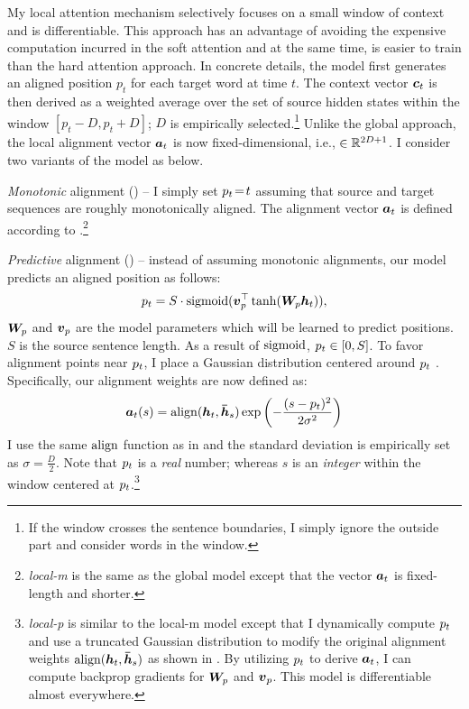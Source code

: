 My local attention mechanism selectively focuses on a small window of
context and is differentiable. This approach has an advantage of avoiding the expensive computation incurred in
the soft attention and at the same time, is easier to train than the hard
attention approach.
In concrete details, the model first generates an aligned position $p_t$ for each target word at time $t$. The
context vector $\mbox{\boldmath{$c$}}_{t}$ is then derived as a weighted average over the set of source hidden states within the window $[p_t-D, p_t+D]$; $D$ is
empirically selected.\footnote{If the window crosses the sentence boundaries, I
simply ignore the outside part and consider words in the window.} Unlike the global approach, the local alignment vector $\mbox{\boldmath{$a$}}_{t}$ is now fixed-dimensional, i.e., $\in \mathbb{R}^{2D+1}$. %
I consider two variants of the model as below.

\textit{Monotonic} alignment ({\bf \localm{}}) -- I simply set %
$p_{t}\!=\!t$ assuming that source and target sequences are roughly
monotonically aligned. The alignment vector $\mbox{\boldmath{$a$}}_{t}$ is defined according to
.\footnote{{\it local-m} is the same as
the global model except that the vector $\mbox{\boldmath{$a$}}_{t}$ is
fixed-length and shorter.} %

\textit{Predictive} alignment ({\bf \localp{}}) --  %
instead of assuming monotonic alignments, our model predicts an aligned position as follows:
\begin{equation}
p_{t} = S \cdot \operatorname{sigmoid}(\mbox{\boldmath{$v$}}_p^\top\tanh(\bm{W}_{p}\mbox{\boldmath{$h$}}_{t})),
\label{e:p}
\end{equation}
$\bm{W}_{p}$ and $\mbox{\boldmath{$v$}}_p$ are the model parameters which will be learned
to predict positions. $S$ is the source sentence length. As a result of $\operatorname{sigmoid}$, $p_{t}
\in [0, S]$. To favor alignment points near $p_{t}$, I place a Gaussian distribution centered around $p_{t}$ . Specifically, our alignment weights are now
defined as:
\begin{equation}
\mbox{\boldmath{$a$}}_{t}(s) = \operatorname{align}(\mbox{\boldmath{$h$}}_{t}, \mbox{\boldmath{$\bar{h}$}}_{s}) \exp \left(-\frac{(s-p_{t})^2}{2\sigma^2}\right) 
\label{e:align_p}
\end{equation}
I use the same $\operatorname{align}$ function as in
 and the standard deviation is empirically set as
$\sigma\!=\!\frac{D}{2}$. Note that $p_{t}$ is a {\it real} number; whereas $s$
is an {\it integer} within the window centered at $p_{t}$.\footnote{{\it local-p} is similar to the
local-m model except that I dynamically
compute $p_{t}$ and use a truncated Gaussian distribution to modify the original alignment
weights $\operatorname{align}(\mbox{\boldmath{$h$}}_{t}, \mbox{\boldmath{$\bar{h}$}}_{s})$ as shown in . By utilizing $p_{t}$
to derive $\mbox{\boldmath{$a$}}_{t}$, I can compute backprop gradients for $\bm{W}_{p}$ and $\mbox{\boldmath{$v$}}_p$.
This model is differentiable almost everywhere.} 

